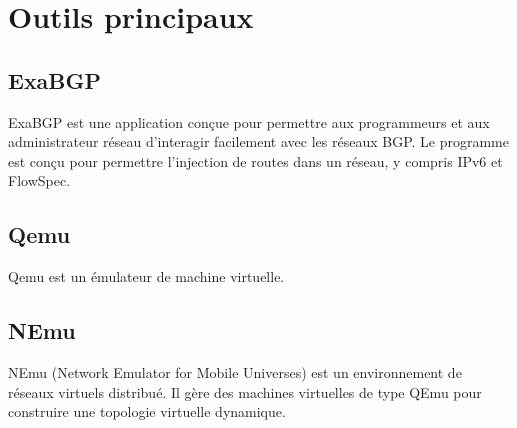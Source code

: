 








\section{Outils principaux}

\subsection{ExaBGP}
ExaBGP est une application conçue pour permettre aux programmeurs et aux administrateur réseau d’interagir facilement avec les réseaux BGP. Le programme est conçu pour permettre l’injection de routes dans un réseau, y compris IPv6 et FlowSpec.
\cite{Man10}



\subsection{Qemu}

Qemu est un émulateur de machine virtuelle.

\subsection{NEmu}
NEmu (Network Emulator for Mobile Universes) est un environnement de réseaux virtuels distribué. Il gère des machines virtuelles de type QEmu pour construire une topologie virtuelle dynamique.


